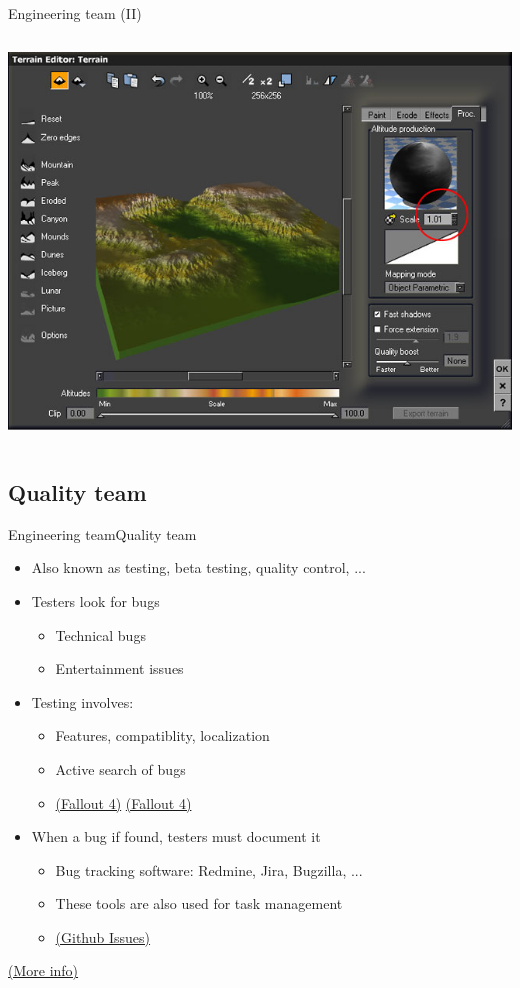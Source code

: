 \documentclass[10pt,compress]{beamer} %
\begin{document}
\begin{frame}[plain]{Engineering team (II)}
\begin{columns}
		\centering\includegraphics[width=\linewidth]{figs/geocontrol07}
		\end{columns}
\end{frame}

\subsection[Quality team]{Quality team}
\begin{frame}{Engineering team}{Quality team}
	\begin{itemize}
		\item Also known as testing, beta testing, quality control, ...
		\item Testers look for bugs
			\begin{itemize}
				\item Technical bugs
				\item Entertainment issues
			\end{itemize}
		\item Testing involves:
			\begin{itemize}
				\item Features, compatiblity, localization
				\item Active search of bugs
                \item \href{https://www.youtube.com/watch?v=eVb_hgMeSDM}{(Fallout 4)} \href{https://fallout.fandom.com/wiki/Test_cell_for_traps}{(Fallout 4)}\\
			\end{itemize}
		\item When a bug if found, testers must document it
			\begin{itemize}
				\item Bug tracking software: Redmine, Jira, Bugzilla, ...
                \item These tools are also used for task management
                \item \href{https://github.com/pythonarcade/arcade/issues}{(Github Issues)}
			\end{itemize}
	\end{itemize}
	\href{http://en.wikipedia.org/wiki/Game\_testing}{(More info)}\\
\end{frame}
\end{document}
